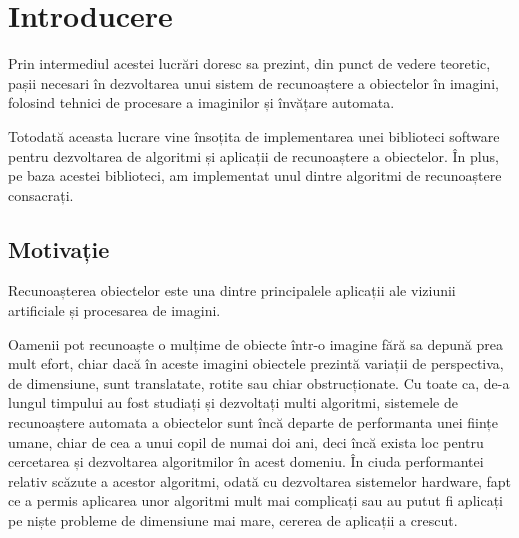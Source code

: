 \chapter{Introducere}


Prin intermediul acestei lucrări doresc sa prezint, din punct de vedere teoretic, pașii necesari în dezvoltarea unui sistem de recunoaștere a obiectelor în imagini, folosind tehnici de procesare a imaginilor și învățare automata.

Totodată aceasta lucrare vine însoțita de implementarea unei biblioteci software pentru dezvoltarea de algoritmi și aplicații de recunoaștere a obiectelor.
În plus, pe baza acestei biblioteci, am implementat unul dintre algoritmi de recunoaștere consacrați.



\section{Motivație}

Recunoașterea obiectelor este una dintre principalele aplicații ale viziunii artificiale și procesarea de imagini. 

Oamenii pot recunoaște o mulțime de obiecte într-o imagine fără sa depună prea mult efort, chiar dacă în aceste imagini obiectele prezintă variații de perspectiva, de dimensiune, sunt translatate, rotite sau chiar obstrucționate. 
Cu toate ca, de-a lungul timpului au fost studiați și dezvoltați multi algoritmi, sistemele de recunoaștere automata a obiectelor sunt încă departe de performanta unei ființe umane, chiar de cea a unui copil de numai doi ani, deci încă exista loc pentru cercetarea și dezvoltarea algoritmilor în acest domeniu.
În ciuda performantei relativ scăzute a acestor algoritmi, odată cu dezvoltarea sistemelor hardware, fapt ce a permis aplicarea unor algoritmi mult mai complicați sau au putut fi aplicați pe niște probleme de dimensiune mai mare, cererea de aplicații a crescut. 

